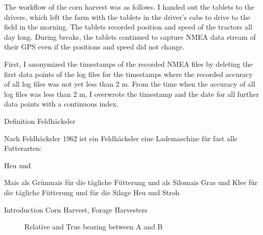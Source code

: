 \documentclass[]{nsm-thesis}
\begin{document}
The workflow of the corn harvest was as follows. 
I handed out the tablets to the drivers, which left the farm with the tablets in the driver's cabs to drive to the field in the morning. The tablets recorded position and speed of the tractors all day long. During breaks, the tablets continued to capture NMEA data stream of their GPS even if the positions and speed did not change.

First, I anonymized the timestamps of the recorded NMEA files by deleting the first data points of the log files for the timestamps where the recorded accuracy of all log files was not yet less than 2 m. From the time when the accuracy of all log files was less than 2 m, I overwrote the timestamp and the date for all further data points with a continuous index.


Definition Feldhäcksler


Nach Feldhäcksler 1962 ist ein Feldhäcksler eine Lademaschine für fast alle Futterarten:

Heu und

Mais als Grünmais für die tägliche Fütterung und als Silomais
Gras und Klee für die tägliche Fütterung und für die Silage
Heu und Stroh 

Introduction Corn Harvest, Forage Harvesters

\begin{figure}%
	\centering
	\caption{Relative and True bearing between A and B}%
	\label{fig:bearing_fh_tm}%
\end{figure}
\end{document}
